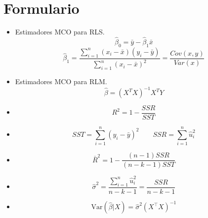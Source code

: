 \documentclass[10pt,a4paper]{article}
\begin{document}
\section{Formulario}


\begin{itemize}

\item  Estimadores MCO para RLS.
{
$$\hat{\beta}_0 = \bar{y} - \hat{\beta}_1 \bar{x} $$
$$\hat{\beta}_1 = \frac{\sum_{i=1}^{n}(x_i - \bar{x})(y_i-\bar{y})}{\sum_{i=1}^{n}(x_i - \bar{x})^2}=\frac{Cov(x,y)}{Var(x)}$$}


\item  Estimadores MCO para RLM.
{
$${\hat{\beta}} = (X^TX)^{-1} X^TY $$}


    \item \[ R^2  = 1 - \frac{SSR}{SST} \] 
\item  $$SST = \sum_{i=1}^{n} (y_i - \bar{y})^2 \quad \quad SSR = \sum_{i=1}^{n}  \hat{u}_i^2 $$
    \item \[ \bar{R}^2 =  1 - \frac{(n-1)SSR}{(n-k-1)SST} \]

    \item  $$\hat{\sigma}^2 = \frac{\sum_{i=1}^{n} \hat{u}_i^2 }{n-k-1}= \frac{SSR}{n - k - 1}$$
    \item \[
\text{Var}(\hat{\beta}|X) = \hat{\sigma}^2(X^{\top}X)^{-1}
\]
    \end{itemize}
\end{document}
